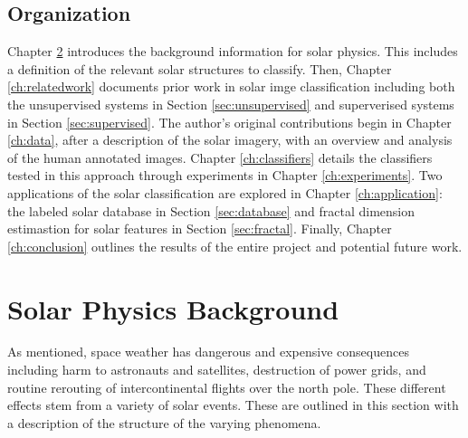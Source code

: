 \documentclass[twoside]{report}
\begin{document}
\section{Organization}
Chapter \ref{ch:background} introduces the background information for solar physics. This includes a definition of the relevant solar structures to classify.  Then, Chapter \ref{ch:relatedwork} documents prior work in solar imge classification including both the unsupervised systems in Section \ref{sec:unsupervised} and superverised systems in Section \ref{sec:supervised}. The author's original contributions begin in Chapter \ref{ch:data}, after a description of the solar imagery, with an overview and analysis of the human annotated images. Chapter \ref{ch:classifiers} details the classifiers tested in this approach through experiments in Chapter \ref{ch:experiments}. Two applications of the solar classification are explored in Chapter \ref{ch:application}: the labeled solar database in Section \ref{sec:database} and fractal dimension estimastion for solar features in Section \ref{sec:fractal}. Finally, Chapter \ref{ch:conclusion} outlines the results of the entire project and potential future work. 

\chapter{Solar Physics Background} \label{ch:background}

As mentioned, space weather has dangerous and expensive consequences including harm to astronauts and satellites, destruction of power grids, and routine rerouting of intercontinental flights over the north pole. These different effects stem from a variety of solar events. These are outlined in this section with a description of the structure of the varying phenomena.
\end{document}
